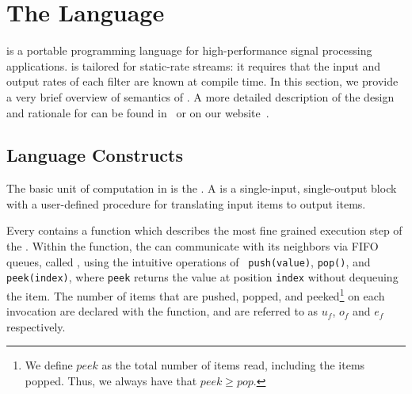 \section{The {\StreamIt} Language}
\label{sec:streamit}

{\StreamIt} is a portable programming language for
high-performance signal processing applications.  {\StreamIt} is
tailored for static-rate streams: it requires that the input and
output rates of each filter are known at compile time.  In this
section, we provide a very brief overview of
semantics of {\StreamIt}.  A more detailed description of the design
and rationale for {\StreamIt} can be found in~\cite{thies02streamit} or
on our website~\cite{streamitweb}.

\subsection{Language Constructs}

The basic unit of computation in {\StreamIt} is the {\filter}. A
{\filter} is a single-input, single-output block with a user-defined
procedure for translating input items to output items.
\begin{comment}
An example of a filter is the {\tt FIRFilter}, a component of our
software radio (see Figure \ref{fig:radiocode}). Each filter
contains an {\tt init} function that is called at initialization
time; in this case, the {\tt FIRFilter} calculates {\tt weights},
which represents its impulse response.
\end{comment}
Every {\filter} contains a {\work} function which describes the most
fine grained execution step of the {\filter}. Within the {\work}
function, the {\filter} can communicate with its neighbors via FIFO
queues, called {\Channels}, using the intuitive operations of {\tt
push(value)}, {\tt pop()}, and {\tt peek(index)}, where {\tt peek}
returns the value at position {\tt index} without dequeuing the
item.  The number of items that are pushed, popped, and
peeked\footnote{We define $peek$ as the total number of items
read, including the items popped.  Thus, we always have that $peek
\ge pop$.} on each invocation are declared with the {\work}
function, and are referred to as $u_f$, $o_f$ and $e_f$
respectively.

\begin{comment}
In addition to {\tt work}, a filter can contain a {\tt prework}
function that is executed exactly once between initialization and
the steady-state.  Like {\tt work}, {\tt prework} can access the
input and output tapes of the filter; however, the I/O rates of
{\tt work} and {\tt prework} can differ. In an {\tt FIRFilter}, a
{\tt prework} function is essential for correctly filtering the
beginning of the input stream.  The user never calls the {\tt
init}, {\tt prework}, and {\tt work} functions--they are all
called automatically.
\end{comment}

